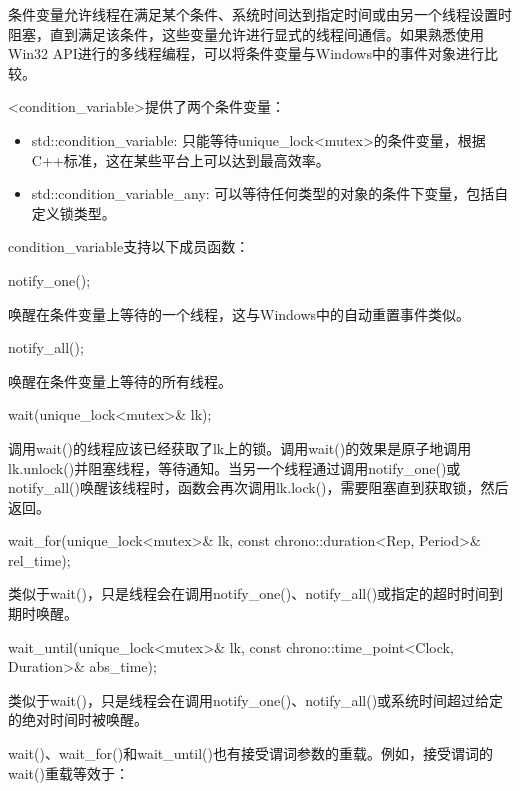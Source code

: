 
条件变量允许线程在满足某个条件、系统时间达到指定时间或由另一个线程设置时阻塞，直到满足该条件，这些变量允许进行显式的线程间通信。如果熟悉使用Win32 API进行的多线程编程，可以将条件变量与Windows中的事件对象进行比较。

<condition\_variable>提供了两个条件变量：

\begin{itemize}
\item
std::condition\_variable: 只能等待unique\_lock<mutex>的条件变量，根据C++标准，这在某些平台上可以达到最高效率。

\item
std::condition\_variable\_any: 可以等待任何类型的对象的条件下变量，包括自定义锁类型。
\end{itemize}

condition\_variable支持以下成员函数：

\begin{cpp}
notify_one();
\end{cpp}

唤醒在条件变量上等待的一个线程，这与Windows中的自动重置事件类似。

\begin{cpp}
notify_all();
\end{cpp}

唤醒在条件变量上等待的所有线程。

\begin{cpp}
wait(unique_lock<mutex>& lk);
\end{cpp}

调用wait()的线程应该已经获取了lk上的锁。调用wait()的效果是原子地调用lk.unlock()并阻塞线程，等待通知。当另一个线程通过调用notify\_one()或notify\_all()唤醒该线程时，函数会再次调用lk.lock()，需要阻塞直到获取锁，然后返回。

\begin{cpp}
wait_for(unique_lock<mutex>& lk, const chrono::duration<Rep, Period>& rel_time);
\end{cpp}

类似于wait()，只是线程会在调用notify\_one()、notify\_all()或指定的超时时间到期时唤醒。

\begin{cpp}
wait_until(unique_lock<mutex>& lk, const chrono::time_point<Clock, Duration>& abs_time);
\end{cpp}

类似于wait()，只是线程会在调用notify\_one()、notify\_all()或系统时间超过给定的绝对时间时被唤醒。

wait()、wait\_for()和wait\_until()也有接受谓词参数的重载。例如，接受谓词的wait()重载等效于：

